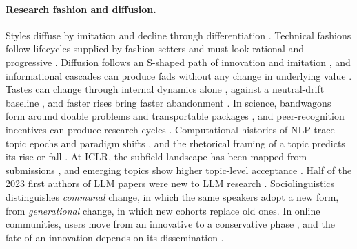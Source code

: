 \paragraph{Research fashion and diffusion.}
Styles diffuse by imitation and decline through differentiation \citep{simmel1957fashion}. Technical fashions follow lifecycles supplied by fashion setters and must look rational and progressive \citep{abrahamson1991managerial,abrahamson1996management,abrahamson1999lifecycles}. Diffusion follows an S-shaped path of innovation and imitation \citep{bass1969new}, and informational cascades can produce fads without any change in underlying value \citep{bikhchandani1992theory}. Tastes can change through internal dynamics alone \citep{lieberson2000matter}, against a neutral-drift baseline \citep{bentley2004random}, and faster rises bring faster abandonment \citep{berger2009adoption}. In science, bandwagons form around doable problems and transportable packages \citep{fujimura1988bandwagon}, and peer-recognition incentives can produce research cycles \citep{bramoulle2010research}. Computational histories of NLP trace topic epochs and paradigm shifts \citep{hall2008studying,anderson2012towards,pramanick2023diachronic,gururaja2023build}, and the rhetorical framing of a topic predicts its rise or fall \citep{prabhakaran2016predicting}. At ICLR, the subfield landscape has been mapped from submissions \citep{gonzalez2024learning}, and emerging topics show higher topic-level acceptance \citep{xu2026reviewer}. Half of the 2023 first authors of LLM papers were new to LLM research \citep{movva2024topics}. Sociolinguistics distinguishes \emph{communal} change, in which the same speakers adopt a new form, from \emph{generational} change, in which new cohorts replace old ones. In online communities, users move from an innovative to a conservative phase \citep{danescu2013nocountry}, and the fate of an innovation depends on its dissemination \citep{altmann2011niche,stewart2018fetch,deltredici2018road}.


